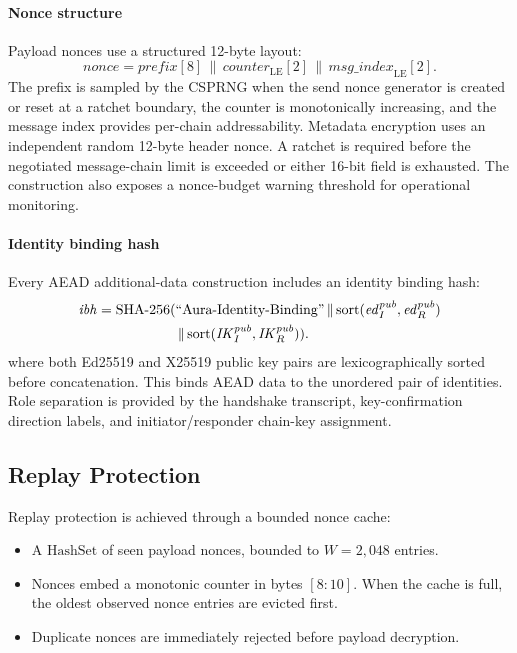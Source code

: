 \documentclass[preprint,12pt]{elsarticle}
\theoremstyle{definition}
\newcommand{\tech}[1]{\textnormal{#1}}
\newcommand{\domain}[1]{\textnormal{``#1''}}
\renewcommand{\mathsf}[1]{\mathrm{#1}}
\newcommand{\SHA}{\tech{SHA-256}}
\newcommand{\concat}{\,\|\,}
\newcommand{\IK}{\mathit{IK}}
\begin{document}
\paragraph{Nonce structure}
Payload nonces use a structured 12-byte layout:
\begin{equation}\label{eq:nonce-layout}
  \mathit{nonce} =
  \mathit{prefix}[8] \concat
  \mathit{counter}_{\mathrm{LE}}[2] \concat
  \mathit{msg\_index}_{\mathrm{LE}}[2].
\end{equation}
The prefix is sampled by the CSPRNG when the send nonce generator is created
or reset at a ratchet boundary, the counter is monotonically increasing,
and the message index provides per-chain addressability. Metadata encryption
uses an independent random 12-byte header nonce. A ratchet is required before
the negotiated message-chain limit is exceeded or either 16-bit field is
exhausted. The construction also exposes a nonce-budget warning threshold for
operational monitoring.

\paragraph{Identity binding hash}
Every AEAD additional-data construction includes an identity binding hash:
\begin{equation}\label{eq:identity-binding}
  \begin{aligned}
  \mathit{ibh} = \SHA(&\domain{Aura-Identity-Binding} \concat
  \mathrm{sort}(\mathit{ed}^{\mathit{pub}}_I,
    \mathit{ed}^{\mathit{pub}}_R)\\
  &\concat
  \mathrm{sort}(\IK^{\mathit{pub}}_I,\IK^{\mathit{pub}}_R)).
  \end{aligned}
\end{equation}
where both Ed25519 and X25519 public key pairs are lexicographically sorted before concatenation. This binds AEAD data to the unordered pair of identities. Role separation is provided by the handshake transcript, key-confirmation direction labels, and initiator/responder chain-key assignment.

\subsection{Replay Protection}\label{sec:replay}

Replay protection is achieved through a bounded nonce cache:
\begin{itemize}
  \item A $\mathsf{HashSet}$ of seen payload nonces, bounded to $W = 2{,}048$ entries.
  \item Nonces embed a monotonic counter in bytes $[8{:}10]$. When the cache is full, the oldest observed nonce entries are evicted first.
  \item Duplicate nonces are immediately rejected before payload decryption.
\end{itemize}
\end{document}
